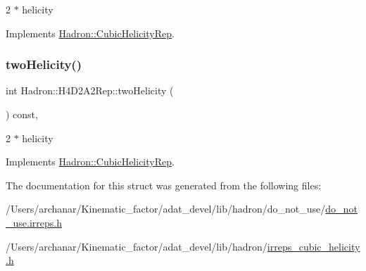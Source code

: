 2 $\ast$ helicity 

Implements \mbox{\hyperlink{structHadron_1_1CubicHelicityRep_af507aa56fc2747eacc8cb6c96db31ecc}{Hadron\+::\+Cubic\+Helicity\+Rep}}.

\mbox{\label{structHadron_1_1H4D2A2Rep_a2d246b554a8500cb82a99cd8139bf313}} 
\subsubsection{\texorpdfstring{twoHelicity()}{twoHelicity()}\hspace{0.1cm}{\footnotesize\ttfamily [2/2]}}
{\footnotesize\ttfamily int Hadron\+::\+H4\+D2\+A2\+Rep\+::two\+Helicity (\begin{DoxyParamCaption}{ }\end{DoxyParamCaption}) const\hspace{0.3cm}{\ttfamily [inline]}, {\ttfamily [virtual]}}

2 $\ast$ helicity 

Implements \mbox{\hyperlink{structHadron_1_1CubicHelicityRep_af507aa56fc2747eacc8cb6c96db31ecc}{Hadron\+::\+Cubic\+Helicity\+Rep}}.



The documentation for this struct was generated from the following files\+:\begin{DoxyCompactItemize}
\item 
/\+Users/archanar/\+Kinematic\+\_\+factor/adat\+\_\+devel/lib/hadron/do\+\_\+not\+\_\+use/\mbox{\hyperlink{do__not__use_8irreps_8h}{do\+\_\+not\+\_\+use.\+irreps.\+h}}\item 
/\+Users/archanar/\+Kinematic\+\_\+factor/adat\+\_\+devel/lib/hadron/\mbox{\hyperlink{lib_2hadron_2irreps__cubic__helicity_8h}{irreps\+\_\+cubic\+\_\+helicity.\+h}}\end{DoxyCompactItemize}
